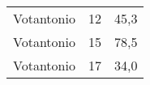 \documentclass[a4paper,10pt]{article}
\begin{document}
\longmapsto

\lipsum[1]

\begin{sideways}
	\begin{tabular}{l r r}
	Votantonio	&	12 &	45,3 \\
	Votantonio	&	15 &	78,5 \\
	Votantonio	&	17 & 	34,0 \\
	\end{tabular}
\end{sideways}



\end{document}
